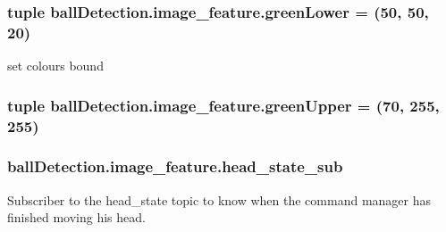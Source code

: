 \subsubsection[{\texorpdfstring{green\+Lower}{greenLower}}]{\setlength{\rightskip}{0pt plus 5cm}tuple ball\+Detection.\+image\+\_\+feature.\+green\+Lower = (50, 50, 20)\hspace{0.3cm}{\ttfamily [static]}}\hypertarget{classballDetection_1_1image__feature_a2b1d1abdc4e93d6a6eba6ba40f5a3f77}{}\label{classballDetection_1_1image__feature_a2b1d1abdc4e93d6a6eba6ba40f5a3f77}


set colours bound 

\subsubsection[{\texorpdfstring{green\+Upper}{greenUpper}}]{\setlength{\rightskip}{0pt plus 5cm}tuple ball\+Detection.\+image\+\_\+feature.\+green\+Upper = (70, 255, 255)\hspace{0.3cm}{\ttfamily [static]}}\hypertarget{classballDetection_1_1image__feature_a0a37e51a267a8f2e81abbbad3c120122}{}\label{classballDetection_1_1image__feature_a0a37e51a267a8f2e81abbbad3c120122}
\subsubsection[{\texorpdfstring{head\+\_\+state\+\_\+sub}{head_state_sub}}]{\setlength{\rightskip}{0pt plus 5cm}ball\+Detection.\+image\+\_\+feature.\+head\+\_\+state\+\_\+sub\hspace{0.3cm}{\ttfamily [static]}}\hypertarget{classballDetection_1_1image__feature_a90bb9d5a57637e7cef2ff093778b3182}{}\label{classballDetection_1_1image__feature_a90bb9d5a57637e7cef2ff093778b3182}


Subscriber to the head\+\_\+state topic to know when the command manager has finished moving his head. 

